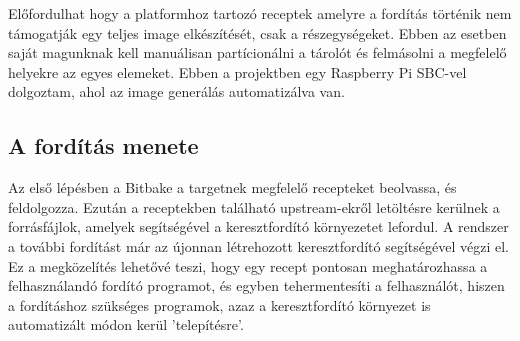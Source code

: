 Előfordulhat hogy a platformhoz tartozó receptek amelyre a fordítás történik nem támogatják egy teljes image elkészítését, csak a részegységeket. Ebben az esetben saját magunknak kell manuálisan partícionálni a tárolót és
felmásolni a megfelelő helyekre az egyes elemeket. Ebben a projektben egy Raspberry Pi SBC-vel dolgoztam, ahol az image generálás automatizálva van.

\subsection{A fordítás menete}

Az első lépésben a Bitbake a targetnek megfelelő recepteket beolvassa, és feldolgozza. Ezután a receptekben található upstream-ekről letöltésre kerülnek a forrásfájlok,
amelyek segítségével a keresztfordító környezetet lefordul. A rendszer a további fordítást már az újonnan létrehozott keresztfordító segítségével végzi el.
Ez a megközelítés lehetővé teszi, hogy egy recept pontosan meghatározhassa a felhasználandó fordító programot, és egyben tehermentesíti a felhasználót, hiszen a fordításhoz szükséges programok, azaz a keresztfordító
környezet is automatizált módon kerül 'telepítésre'.


